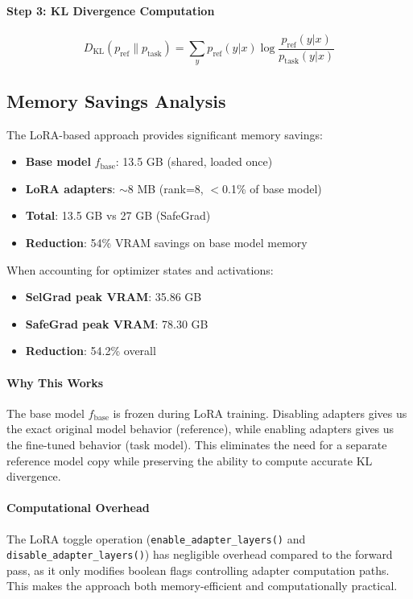 \paragraph{Step 3: KL Divergence Computation}
\begin{equation}
D_{\text{KL}}(p_{\text{ref}} \| p_{\text{task}}) = \sum_y p_{\text{ref}}(y|x) \log \frac{p_{\text{ref}}(y|x)}{p_{\text{task}}(y|x)}
\end{equation}

\subsection{Memory Savings Analysis}
\label{subsec:memory_savings}

The LoRA-based approach provides significant memory savings:

\begin{itemize}
    \item \textbf{Base model} $f_{\text{base}}$: 13.5 GB (shared, loaded once)
    \item \textbf{LoRA adapters}: $\sim$8 MB (rank=8, $<$0.1\% of base model)
    \item \textbf{Total}: 13.5 GB vs 27 GB (SafeGrad)
    \item \textbf{Reduction}: 54\% VRAM savings on base model memory
\end{itemize}

When accounting for optimizer states and activations:
\begin{itemize}
    \item \textbf{SelGrad peak VRAM}: 35.86 GB
    \item \textbf{SafeGrad peak VRAM}: 78.30 GB
    \item \textbf{Reduction}: 54.2\% overall
\end{itemize}

\paragraph{Why This Works}
The base model $f_{\text{base}}$ is frozen during LoRA training. Disabling adapters gives us the exact original model behavior (reference), while enabling adapters gives us the fine-tuned behavior (task model). This eliminates the need for a separate reference model copy while preserving the ability to compute accurate KL divergence.

\paragraph{Computational Overhead}
The LoRA toggle operation (\texttt{enable\_adapter\_layers()} and \texttt{disable\_adapter\_layers()}) has negligible overhead compared to the forward pass, as it only modifies boolean flags controlling adapter computation paths. This makes the approach both memory-efficient and computationally practical.

